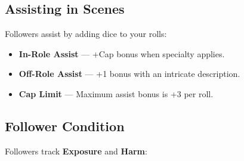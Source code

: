 \subsection*{Assisting in Scenes}

Followers assist by adding dice to your rolls:

\begin{itemize}
  \item \textbf{In-Role Assist} — +Cap bonus when specialty applies.
  \item \textbf{Off-Role Assist} — +1 bonus with an intricate description.
  \item \textbf{Cap Limit} — Maximum assist bonus is +3 per roll.
\end{itemize}

\subsection*{Follower Condition}

Followers track \textbf{Exposure} and \textbf{Harm}:

